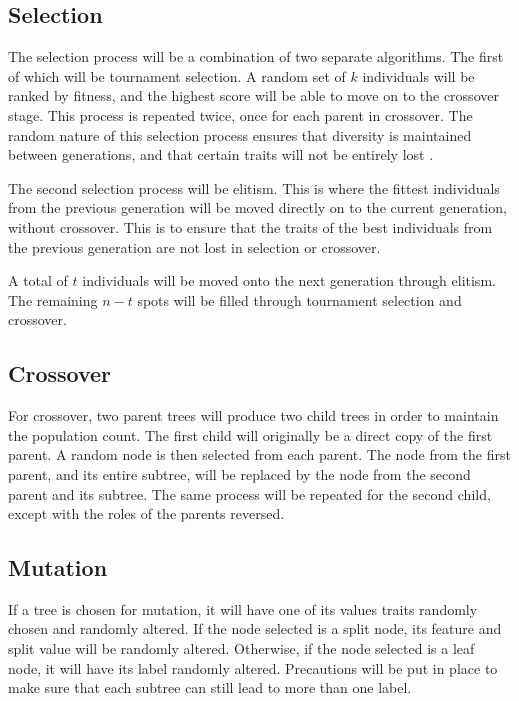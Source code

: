 \documentclass[12pt]{article}
\begin{document}
\subsection{Selection}

The selection process will be a combination of two separate algorithms. The first of which will be tournament selection. A random set of $k$ individuals will be ranked by fitness, and the highest score will be able to move on to the crossover stage. This process is repeated twice, once for each parent in crossover. The random nature of this selection process ensures that diversity is maintained between generations, and that certain traits will not be entirely lost \cite{blickle_1997}.

The second selection process will be elitism. This is where the fittest individuals from the previous generation will be moved directly on to the current generation, without crossover. This is to ensure that the traits of the best individuals from the previous generation are not lost in selection or crossover.

A total of $t$ individuals will be moved onto the next generation through elitism. The remaining $n - t$ spots will be filled through tournament selection and crossover.

\subsection{Crossover}

For crossover, two parent trees will produce two child trees in order to maintain the population count. The first child will originally be a direct copy of the first parent. A random node is then selected from each parent. The node from the first parent, and its entire subtree, will be replaced by the node from the second parent and its subtree. The same process will be repeated for the second child, except with the roles of the parents reversed.


\subsection{Mutation}

If a tree is chosen for mutation, it will have one of its values traits randomly chosen and randomly altered. If the node selected is a split node, its feature and split value will be randomly altered. Otherwise, if the node selected is a leaf node, it will have its label randomly altered. Precautions will be put in place to make sure that each subtree can still lead to more than one label.
\end{document}
